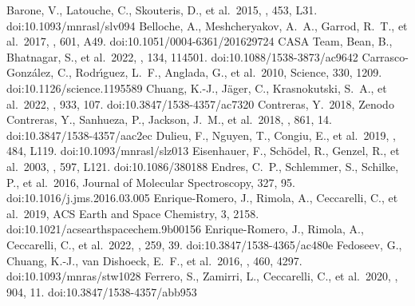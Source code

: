 \documentclass[twocolumn, twocolappendix]{aastex631}
\begin{document}

\begin{thebibliography}{}
 Barone, V., Latouche, C., Skouteris, D., et al.\ 2015, \mnras, 453, L31. doi:10.1093/mnrasl/slv094
 Belloche, A., Meshcheryakov, A.~A., Garrod, R.~T., et al.\ 2017, \aap, 601, A49. doi:10.1051/0004-6361/201629724
 CASA Team, Bean, B., Bhatnagar, S., et al.\ 2022, \pasp, 134, 114501. doi:10.1088/1538-3873/ac9642
 Carrasco-Gonz{\'a}lez, C., Rodr{\'\i}guez, L.~F., Anglada, G., et al.\ 2010, Science, 330, 1209. doi:10.1126/science.1195589
 Chuang, K.-J., J{\"a}ger, C., Krasnokutski, S.~A., et al.\ 2022, \apj, 933, 107. doi:10.3847/1538-4357/ac7320
 Contreras, Y.\ 2018, Zenodo
 Contreras, Y., Sanhueza, P., Jackson, J.~M., et al.\ 2018, \apj, 861, 14. doi:10.3847/1538-4357/aac2ec
 Dulieu, F., Nguyen, T., Congiu, E., et al.\ 2019, \mnras, 484, L119. doi:10.1093/mnrasl/slz013
 Eisenhauer, F., Sch{\"o}del, R., Genzel, R., et al.\ 2003, \apjl, 597, L121. doi:10.1086/380188
 Endres, C.~P., Schlemmer, S., Schilke, P., et al.\ 2016, Journal of Molecular Spectroscopy, 327, 95. doi:10.1016/j.jms.2016.03.005
 Enrique-Romero, J., Rimola, A., Ceccarelli, C., et al.\ 2019, ACS Earth and Space Chemistry, 3, 2158. doi:10.1021/acsearthspacechem.9b00156
 Enrique-Romero, J., Rimola, A., Ceccarelli, C., et al.\ 2022, \apjs, 259, 39. doi:10.3847/1538-4365/ac480e
 Fedoseev, G., Chuang, K.-J., van Dishoeck, E.~F., et al.\ 2016, \mnras, 460, 4297. doi:10.1093/mnras/stw1028
 Ferrero, S., Zamirri, L., Ceccarelli, C., et al.\ 2020, \apj, 904, 11. doi:10.3847/1538-4357/abb953

\end{thebibliography}
\end{document}
